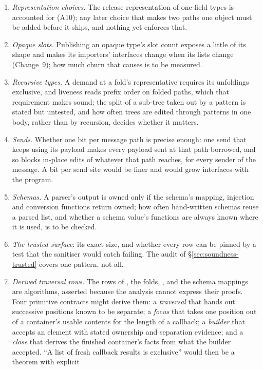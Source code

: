 \begin{enumerate}
the platform's whole-program condition, is open (\S\ref{sec:compiler-records}).
\item \emph{Representation choices.} The release representation of one-field types is accounted for (A10);
any later choice that makes two paths one object must be added before it ships, and nothing yet enforces
that.
\item \emph{Opaque slots.} Publishing an opaque type's slot count exposes a little of its shape and makes
its importers' interfaces change when its lists change (Change~9); how much churn that causes is to be
measured.
\item \emph{Recursive types.} A demand at a fold's representative requires its unfoldings exclusive, and
liveness reads prefix order on folded paths, which that requirement makes sound; the split of a sub-tree
taken out by a pattern is stated but untested, and how often trees are edited through patterns in one body,
rather than by recursion, decides whether it matters.
\item \emph{Sends.} Whether one bit per message path is precise enough: one send that keeps using its
payload makes every payload sent at that path borrowed, and so blocks in-place edits of whatever that path
reaches, for every sender of the message. A bit per send site would be finer and would grow interfaces with
the program.
\item \emph{Schemas.} A parser's output is owned only if the schema's mapping, injection and conversion
functions return owned; how often hand-written schemas reuse a parsed list, and whether a schema value's
functions are always known where it is used, is to be checked.
\item \emph{The trusted surface}: its exact size, and whether every row can be pinned by a test that the
sanitiser would catch failing. The audit of \S\ref{sec:soundness-trusted} covers one pattern, not all.
\item \emph{Derived traversal rows.} The rows of , the folds, ,
 and the schema mappings are algorithms, asserted because the analysis cannot express
their proofs. Four primitive contracts might derive them: a \emph{traversal} that hands out successive
positions known to be separate; a \emph{focus} that takes one position out of a container's usable
contents for the length of a callback; a \emph{builder} that accepts an element with stated ownership and
separation evidence; and a \emph{close} that derives the finished container's facts from what the builder
accepted. ``A list of fresh callback results is exclusive'' would then be a theorem with explicit

\end{enumerate}
